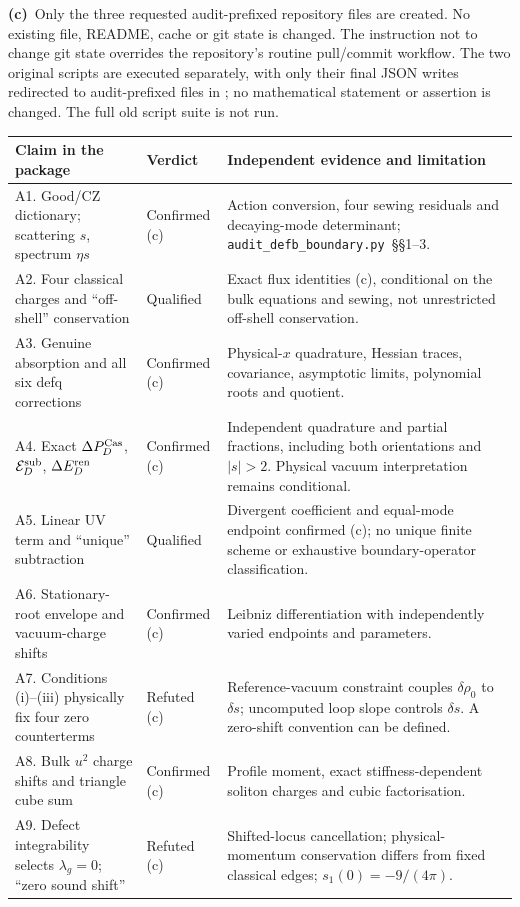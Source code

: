 \documentclass[11pt,a4paper]{article}
\newcommand{\Lc}{\textbf{(c)}\ }
\newcommand{\scr}{\texttt{audit\_\allowbreak defb\_\allowbreak boundary.py}}
\newcommand{\file}[1]{\texttt{\detokenize{#1}}}
\begin{document}
\Lc Only the three requested audit-prefixed repository files are created.
No existing file, README, cache or git state is changed. The instruction not
to change git state overrides the repository's routine pull/commit workflow.
The two original scripts are executed separately, with only their final JSON
writes redirected to audit-prefixed files in \file{/tmp/}; no mathematical
statement or assertion is changed. The full old script suite is not run.

\begin{longtable}{@{}L{6.0cm}L{2.0cm}L{7.3cm}@{}}
\toprule Claim in the package & Verdict & Independent evidence and limitation\\\midrule\endhead
A1. Good/CZ dictionary; scattering $s$, spectrum $\eta s$ & Confirmed (c) & Action conversion, four sewing residuals and decaying-mode determinant; \scr\ §§1--3.\\
A2. Four classical charges and ``off-shell'' conservation & Qualified & Exact flux identities (c), conditional on the bulk equations and sewing, not unrestricted off-shell conservation.\\
A3. Genuine absorption and all six defq corrections & Confirmed (c) & Physical-$x$ quadrature, Hessian traces, covariance, asymptotic limits, polynomial roots and quotient.\\
A4. Exact $\Delta P_D^{\rm Cas}$, $\mathcal E_D^{\rm sub}$, $\Delta E_D^{\rm ren}$ & Confirmed (c) & Independent quadrature and partial fractions, including both orientations and $|s|>2$. Physical vacuum interpretation remains conditional.\\
A5. Linear UV term and ``unique'' subtraction & Qualified & Divergent coefficient and equal-mode endpoint confirmed (c); no unique finite scheme or exhaustive boundary-operator classification.\\
A6. Stationary-root envelope and vacuum-charge shifts & Confirmed (c) & Leibniz differentiation with independently varied endpoints and parameters.\\
A7. Conditions (i)--(iii) physically fix four zero counterterms & Refuted (c) & Reference-vacuum constraint couples $\delta\rho_0$ to $\delta s$; uncomputed loop slope controls $\delta s$. A zero-shift convention can be defined.\\
A8. Bulk $u^2$ charge shifts and triangle cube sum & Confirmed (c) & Profile moment, exact stiffness-dependent soliton charges and cubic factorisation.\\
A9. Defect integrability selects $\lambda_g=0$; ``zero sound shift'' & Refuted (c) & Shifted-locus cancellation; physical-momentum conservation differs from fixed classical edges; $s_1(0)=-9/(4\pi)$.\\

\end{longtable}
\end{document}
